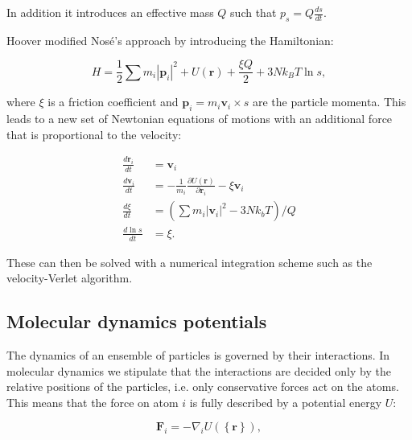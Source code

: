 In addition it introduces an effective mass $Q$ such that $p_s = Q\frac{ds}{dt}$.
\par
Hoover modified Nosé's approach by introducing the Hamiltonian:

\begin{equation}
 H = \frac{1}{2} \sum m_i \left| \bm{p}_i \right|^2 + U(\bm{r}) + \frac{\xi Q}{2}
    + 3Nk_B T \ln{s} , 
\end{equation}

where $\xi$ is a friction coefficient and $\bm{p}_i = m_i\bm{v}_i \times s$
are the particle momenta. This leads to a new set of Newtonian equations of motions
with an additional force that is proportional to the velocity:

\begin{equation}
\begin{split}
    \frac{d\bm{r}_i}{dt} &= \bm{v}_i \\
    \frac{d\bm{v}_i}{dt} &= - \frac{1}{m_i} \frac{\partial U(\bm{r})}{\partial \bm{r}_i}
    - \xi \bm{v}_i \\
    \frac{d\xi}{dt} &= \left( \sum m_i \left| \bm{v}_i \right|^2 - 3Nk_b T \right) / Q \\
    \frac{d \ln{s}}{dt} &= \xi .
\end{split}
\end{equation}

These can then be solved with a numerical integration scheme such as the
velocity-Verlet algorithm.

\subsection{Molecular dynamics potentials}
The dynamics of an ensemble of particles is governed by
their interactions. In molecular dynamics we stipulate that
the interactions are decided only by the relative positions
of the particles, i.e. only conservative forces act on the atoms.
This means that the force on atom $i$ is fully described
by a potential energy $U$:

\begin{equation}
 \bm{F}_i = -\nabla_i U \left(\left\{ \bm{r} \right\} \right) , 
\end{equation}

